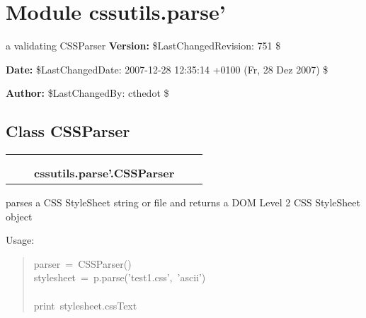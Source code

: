 %
%
%


\section{Module cssutils.parse'}

    \label{cssutils:parse'}

a validating CSSParser
\textbf{Version:} \$LastChangedRevision: 751 \$



\textbf{Date:} \$LastChangedDate: 2007-12-28 12:35:14 +0100 (Fr, 28 Dez 2007) \$



\textbf{Author:} \$LastChangedBy: cthedot \$





\subsection{Class CSSParser}

    \label{cssutils:parse':CSSParser}
\begin{tabular}{cccccc}
\multicolumn{2}{r}{\settowidth{\BCL}{object}\multirow{2}{\BCL}{object}}
&&
  \\\cline{3-3}
  &&\multicolumn{1}{c|}{}
&&
  \\
&&\multicolumn{2}{l}{\textbf{cssutils.parse'.CSSParser}}
\end{tabular}


parses a CSS StyleSheet string or file and
returns a DOM Level 2 CSS StyleSheet object

Usage:
\begin{quote}{\ttfamily \raggedright \noindent
parser~=~CSSParser()~\\
stylesheet~=~p.parse('test1.css',~'ascii')~\\
~\\
print~stylesheet.cssText
}\end{quote}

